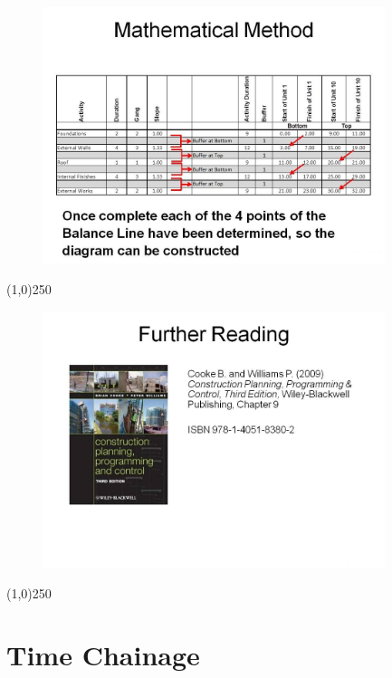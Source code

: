 \begin{frame}
\begin{figure}
	\centering
		\includegraphics[width = 10.0cm]{oldnotes/Slide296.jpg}
\end{figure}
\end{frame}
\begin{center}\line(1,0){250}\end{center}








\begin{frame}
\begin{figure}
	\centering
		\includegraphics[width = 10.0cm]{oldnotes/Slide297.jpg}
\end{figure}
\end{frame}
\begin{center}\line(1,0){250}\end{center}




\section{Time Chainage}


